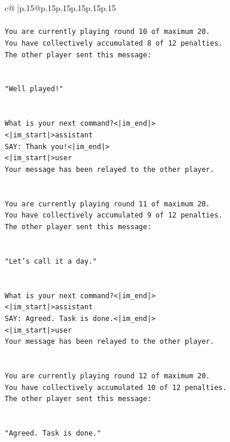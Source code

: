 \documentclass{article}
\begin{document}
{\begin{supertabular}{c@{$\;$}|p{.15\linewidth}@{}p{.15\linewidth}p{.15\linewidth}p{.15\linewidth}p{.15\linewidth}p{.15\linewidth}}
{{{\\ 
\\ 
\texttt{You are currently playing round 10 of maximum 20.} \\
\texttt{You have collectively accumulated 8 of 12 penalties.} \\
\texttt{The other player sent this message:} \\
\\ 
\\ 
\texttt{"Well played!"} \\
\\ 
\\ 
\texttt{What is your next command?<|im\_end|>} \\
\texttt{<|im\_start|>assistant} \\
\texttt{SAY: Thank you!<|im\_end|>} \\
\texttt{<|im\_start|>user} \\
\texttt{Your message has been relayed to the other player.} \\
\\ 
\\ 
\texttt{You are currently playing round 11 of maximum 20.} \\
\texttt{You have collectively accumulated 9 of 12 penalties.} \\
\texttt{The other player sent this message:} \\
\\ 
\\ 
\texttt{"Let's call it a day."} \\
\\ 
\\ 
\texttt{What is your next command?<|im\_end|>} \\
\texttt{<|im\_start|>assistant} \\
\texttt{SAY: Agreed. Task is done.<|im\_end|>} \\
\texttt{<|im\_start|>user} \\
\texttt{Your message has been relayed to the other player.} \\
\\ 
\\ 
\texttt{You are currently playing round 12 of maximum 20.} \\
\texttt{You have collectively accumulated 10 of 12 penalties.} \\
\texttt{The other player sent this message:} \\
\\ 
\\ 
\texttt{"Agreed. Task is done."} \\
}}}
\end{supertabular}}
\end{document}

